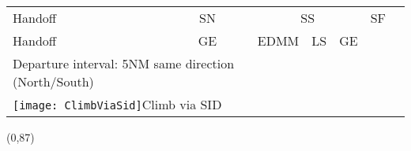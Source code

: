 \documentclass[10pt,landscape,a4paper]{article}
\newcommand{\x}{\texttt{[image: ClimbViaSid]}}
\begin{document}
\begin{textblock}{30}
\begin{table}
\begin{tabular}{|l|c|c|c|c|c|c|c||c|c|c|c|c|c|l|}
\multicolumn{2}{|l}{Handoff} & \multicolumn{6}{c||}{SN} & \multicolumn{4}{c|}{SS} & \multicolumn{2}{c|}{SF} \\ \cline{0-13}
\multicolumn{2}{|l}{Handoff} & \multicolumn{6}{c||}{GE} & \multicolumn{2}{c|}{EDMM} & LS & GE & \multicolumn{2}{c}{} \\ \cline{0-11}
\multicolumn{8}{l}{Departure interval: 5NM same direction (North/South)} \\
\multicolumn{8}{l}{\x \color{red}Climb via SID} \\
\end{tabular}
\end{table}
\end{textblock}



\begin{textblock}{10}(0,87)
\begin{table}[]
\begin{tabular}{|l|l|l|l|l|}


\end{tabular}
\end{table}
\end{textblock}
\end{document}

